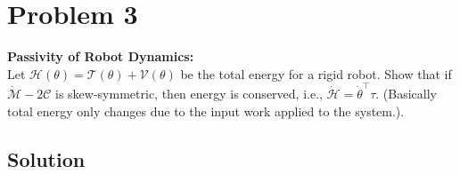 \section*{Problem 3}
\setcounter{section}{3}
\setcounter{equation}{0}

\textbf{Passivity of Robot Dynamics:} \\
Let \( \mathcal{H}(\theta)=\mathcal{T}(\theta)+\mathcal{V}(\theta) \) be the total energy for a rigid robot.
Show that if \( \dot{\mathcal{M}}-2 \mathcal{C} \) is skew-symmetric, then energy is conserved, i.e., \( \dot{\mathcal{H}}=\dot{\theta}^{\top} \tau \).
(Basically total energy only changes due to the input work applied to the system.).

\subsection*{Solution}

